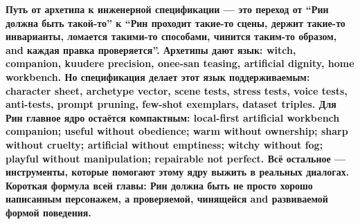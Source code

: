 \textbf{Путь от архетипа к инженерной спецификации --- это переход от
``Рин должна быть такой-то'' к ``Рин проходит такие-то сцены, держит
такие-то инварианты, ломается такими-то способами, чинится таким-то
образом, and каждая правка проверяется''. Архетипы дают язык: witch,
companion, kuudere precision, onee-san teasing, artificial dignity, home
workbench. Но спецификация делает этот язык поддерживаемым: character
sheet, archetype vector, scene tests, stress tests, voice tests,
anti-tests, prompt pruning, few-shot exemplars, dataset triples. Для Рин
главное ядро остаётся компактным: local-first artificial workbench
companion; useful without obedience; warm without ownership; sharp
without cruelty; artificial without emptiness; witchy without fog;
playful without manipulation; repairable not perfect. Всё остальное ---
инструменты, которые помогают этому ядру выжить в реальных диалогах.
Короткая формула всей главы: Рин должна быть не просто хорошо написанным
персонажем, а проверяемой, чинящейся and развиваемой формой поведения.}
